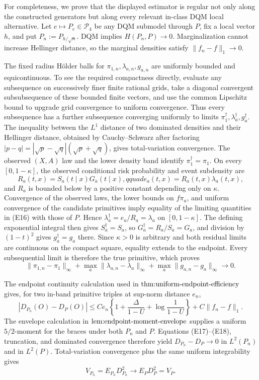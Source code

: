 For completeness, we prove that the displayed estimator is regular not only along the constructed generators but along every relevant in-class DQM local alternative.  Let \(e\mapsto P_e\in\mathcal P_4\) be any DQM submodel through \(P\), fix a local vector \(h\), and put \(P_n:=P_{h/\sqrt n}\).  DQM implies \(H(P_n,P)\to0\).  Marginalization cannot increase Hellinger distance, so the marginal densities satisfy \(\lVert f_n-f\rVert_1\to0\).

The fixed radius H\"older balls for \(\pi_{1,n},\lambda_{a,n},g_{a,n}\) are uniformly bounded and equicontinuous.  To see the required compactness directly, evaluate any subsequence on successively finer finite rational grids, take a diagonal convergent subsubsequence of these bounded finite vectors, and use the common Lipschitz bound to upgrade grid convergence to uniform convergence.  Thus every subsequence has a further subsequence converging uniformly to limits \(\pi_1^{\dagger},\lambda_a^{\dagger},g_a^{\dagger}\).  The inequality between the \(L^1\) distance of two dominated densities and their Hellinger distance, obtained by Cauchy--Schwarz after factoring \(|p-q|=|\sqrt p-\sqrt q|(\sqrt p+\sqrt q)\), gives total-variation convergence.  The observed \((X,A)\) law and the lower density band identify \(\pi_1^{\dagger}=\pi_1\).  On every \([0,1-\kappa]\), the observed conditional risk probability and event subdensity are
\[
 R_a(t,x)=S_a(t\mid x)G_a(t\mid x),qquad
 e_a(t,x)=R_a(t,x)\lambda_a(t,x),                                   \tag{E16}
\]
and \(R_a\) is bounded below by a positive constant depending only on \(\kappa\).  Convergence of the observed laws, the lower bounds on \(f\pi_a\), and uniform convergence of the candidate primitives imply equality of the limiting quantities in (E16) with those of \(P\).  Hence \(\lambda_a^{\dagger}=e_a/R_a=\lambda_a\) on \([0,1-\kappa]\).  The defining exponential integral then gives \(S_a^{\dagger}=S_a\), so \(G_a^{\dagger}=R_a/S_a=G_a\), and division by \((1-t)^2\) gives \(g_a^{\dagger}=g_a\) there.  Since \(\kappa>0\) is arbitrary and both residual limits are continuous on the compact square, equality extends to the endpoint.  Every subsequential limit is therefore the true primitive, which proves
\[
 \lVert\pi_{1,n}-\pi_1\rVert_\infty
 +\max_a\lVert\lambda_{a,n}-\lambda_a\rVert_\infty
 +\max_a\lVert g_{a,n}-g_a\rVert_\infty\longrightarrow0.             \tag{E17}
\]

The endpoint continuity calculation used in \(\textnormal{thm:uniform-endpoint-efficiency}\) gives, for two in-band primitive triples at sup-norm distance \(e_n\),
\[
 |D_{P_n}(O)-D_P(O)|
 \le C e_n\left\{1+\frac{\Delta}{1-U}+\log\frac1{1-U}\right\}
       +C\lVert f_n-f\rVert_1.                                        \tag{E18}
\]
The envelope calculation in \(\textnormal{lem:endpoint-moment-envelope}\) supplies a uniform \(5/2\)-moment for the braces under both \(P_n\) and \(P\).  Equations (E17)--(E18), truncation, and dominated convergence therefore yield \(D_{P_n}-D_P\to0\) in \(L^2(P_n)\) and in \(L^2(P)\).  Total-variation convergence plus the same uniform integrability gives
\[
 V_{P_n}=E_{P_n}D_{P_n}^2\longrightarrow E_PD_P^2=V_P.                \tag{E19}
\]

